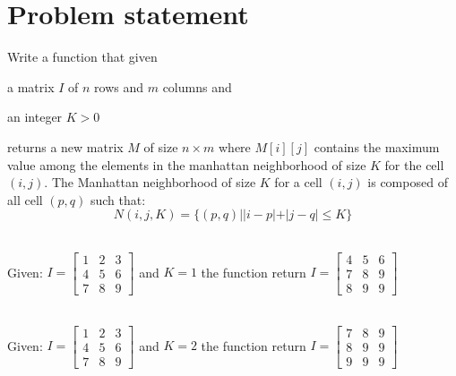 \section{Problem statement}
\begin{exercise}
\label{example:max_manhattan:exercice1}
Write a function that given \begin{enumerate*}
    \item a matrix $I$ of $n$ rows and $m$ columns and
    \item  an integer $K > 0$
\end{enumerate*}
returns a new matrix $M$ of size $n \times m$ where $M[i][j]$ contains the maximum value among the
elements in the manhattan neighborhood of size $K$ for the cell $(i,j)$. The Manhattan neighborhood
of size $K$ for a cell $(i,j)$ is composed of all cell $(p,q)$ such that:
\begin{equation}
    N(i,j, K) = \{(p,q) | |i-p|+|j-q| \leq K\}
    \label{eq:max_manhattan:neighbood_equation}
\end{equation}


\end{exercise}
    \begin{example}
        \label{example:max_manhattan:example1}
        \hfill \\
        Given: $I=
        \begin{bmatrix}
          1 & 2 & 3  \\
          4 & 5 & 6  \\
          7 & 8 & 9  
        \end{bmatrix}
      $
  and $K=1$ the function return $I=
  \begin{bmatrix}
      4 & 5 & 6  \\
      7 & 8 & 9  \\
      8 & 9 & 9  
    \end{bmatrix}
$
        
    \end{example}

    \begin{example}
        \label{example:max_manhattan:example2}
        \hfill \\
        Given: $I=
        \begin{bmatrix}
          1 & 2 & 3  \\
          4 & 5 & 6  \\
          7 & 8 & 9  
        \end{bmatrix}
      $
  and $K=2$ the function return $I=
  \begin{bmatrix}
      7 & 8 & 9  \\
      8 & 9 & 9  \\
      9 & 9 & 9  
    \end{bmatrix}
$
        
    \end{example}





